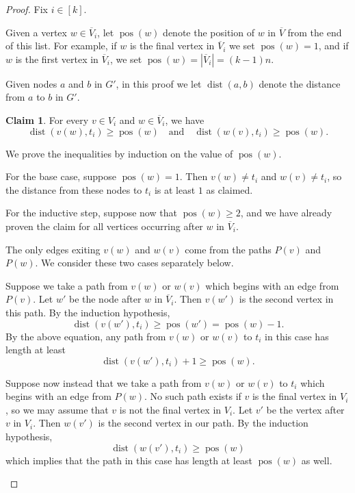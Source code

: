\documentclass[11pt]{article}
\DeclareMathOperator{\dist}{dist}
\renewcommand{\bar}{\overline}
\DeclareMathOperator{\pos}{pos}
\theoremstyle{definition}
\newtheorem{claim}[theorem]{Claim}
\begin{document}
\begin{proof}
Fix $i\in[k]$.

Given a vertex $w\in \bar{V}_i$, let $\pos(w)$ denote the position of $w$ in $\overline{V}$ from the end of this list.
For example, if $w$ is the final vertex in $\overline{V}_i$ we set $\pos(w) = 1$, and if $w$ is the first vertex in $\bar{V}_i$, we set $\pos(w) = |\bar{V}_i| = (k-1)n$.

Given nodes $a$ and $b$ in $G'$, in this proof we let $\dist(a,b)$ denote the distance from $a$ to $b$ in $G'$.

\begin{claim}
\label{claim:distance}
    For every $v\in V_i$ and $w\in \bar{V}_i$,
    we have 
    \begin{equation}
    \label{induction}
    \dist(v(w),t_i) \ge \pos(w)\quad\text{and}\quad \dist(w(v),t_i)\ge \pos(w).
    \end{equation}
\end{claim}
\begin{claimproof}
    We prove the inequalities by induction on the value of $\pos(w)$.

    For the base case, suppose $\pos(w) = 1$.
    Then $v(w)\neq t_i$ and $w(v)\neq t_i$, so the distance from these nodes to $t_i$ is at least $1$ as claimed.

    For the inductive step, suppose now that $\pos(w) \ge 2$, and we have already proven the claim for all vertices occurring after $w$ in $\bar{V}_i$.
    
    
    The only edges exiting $v(w)$ and $w(v)$ come from the paths $P(v)$ and $P(w)$.
    We consider these two cases separately below.

Suppose we take a path from $v(w)$ or $w(v)$ which begins with an edge from $P(v)$.
Let $w'$ be the node after $w$ in $\bar{V}_i$.
Then $v(w')$ is the second vertex in this path.
By the induction hypothesis, 
\[\dist(v(w'),t_i) \ge \pos(w') = \pos(w)-1.\]
By the above equation, any path from $v(w)$ or $w(v)$ to $t_i$ in this case has length at least 
    \[\dist(v(w'),t_i) + 1  \ge \pos(w).\]

Suppose now instead that we take a path from $v(w)$ or $w(v)$ to $t_i$ which begins with an edge from $P(w)$.
No such path exists if $v$ is the final vertex in $V_i$, so we may assume that $v$ is not the final vertex in $V_i$.
Let $v'$ be the vertex after $v$ in $V_i$.
Then $w(v')$ is the second vertex in our path.
By the induction hypothesis, 
\[\dist(w(v'),t_i)\ge \pos(w)\]
which implies that the path in this case has length at least $\pos(w)$ as well.


\end{claimproof}
\end{proof}
\end{document}
